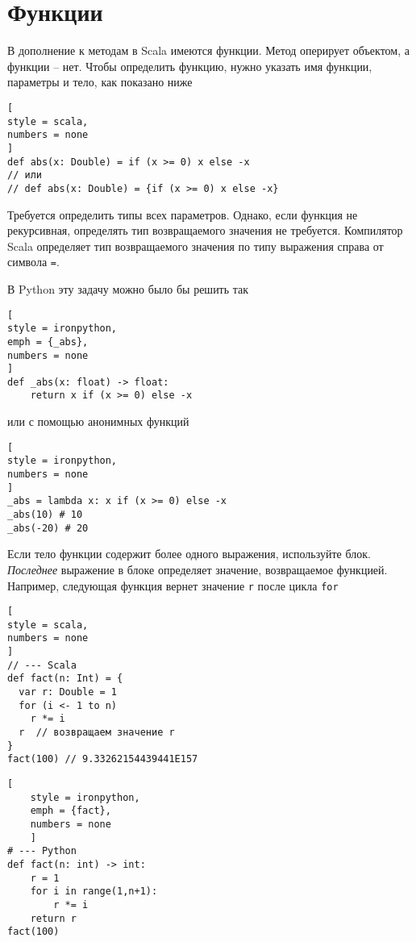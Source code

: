 \documentclass[%
	11pt,
	a4paper,
	utf8,
		]{article}
\begin{document}
\section{Функции}

В дополнение к методам в Scala имеются функции. Метод оперирует объектом, а функции -- нет. Чтобы определить функцию, нужно указать имя функции, параметры и тело, как показано ниже
\begin{lstlisting}[
style = scala,
numbers = none
]
def abs(x: Double) = if (x >= 0) x else -x
// или
// def abs(x: Double) = {if (x >= 0) x else -x}
\end{lstlisting}

Требуется определить типы всех параметров. Однако, если функция не рекурсивная, определять тип возвращаемого значения не требуется. Компилятор Scala определяет тип возвращаемого значения по типу выражения справа от символа \texttt{=}.

В Python эту задачу можно было бы решить так
\begin{lstlisting}[
style = ironpython,
emph = {_abs},
numbers = none
]
def _abs(x: float) -> float:
    return x if (x >= 0) else -x
\end{lstlisting}
или с помощью анонимных функций
\begin{lstlisting}[
style = ironpython,
numbers = none
]
_abs = lambda x: x if (x >= 0) else -x
_abs(10) # 10
_abs(-20) # 20
\end{lstlisting}

Если тело функции содержит более одного выражения, используйте блок. \emph{Последнее} выражение в блоке определяет значение, возвращаемое функцией. Например, следующая функция вернет значение \texttt{r} после цикла \texttt{for}

\begin{minipage}[t]{0.45\textwidth}
\begin{lstlisting}[
style = scala,
numbers = none
]
// --- Scala
def fact(n: Int) = {
  var r: Double = 1
  for (i <- 1 to n)
    r *= i
  r  // возвращаем значение r
}
fact(100) // 9.33262154439441E157
\end{lstlisting}
\end{minipage}
\hspace*{2mm}
\begin{minipage}[t]{0.45\textwidth}
	\begin{lstlisting}[
	style = ironpython,
	emph = {fact},
	numbers = none
	]
# --- Python
def fact(n: int) -> int:
    r = 1
    for i in range(1,n+1):
        r *= i
    return r
fact(100)
	\end{lstlisting}
\end{minipage}
\end{document}

